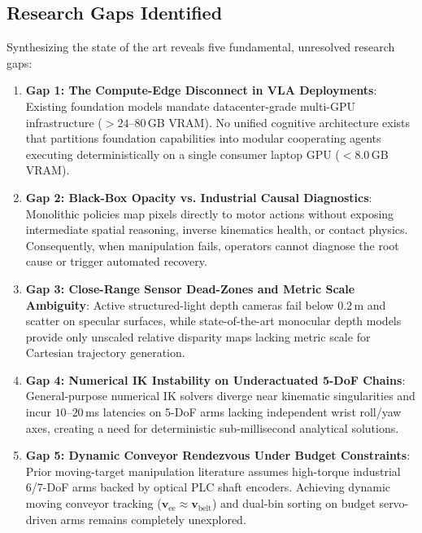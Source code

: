 \documentclass[journal]{IEEEtran}
\begin{document}
\subsection{Research Gaps Identified}
Synthesizing the state of the art reveals five fundamental, unresolved research gaps:
\begin{enumerate}
    \item \textbf{Gap 1: The Compute-Edge Disconnect in VLA Deployments}: Existing foundation models mandate datacenter-grade multi-GPU infrastructure ($>24\text{--}80$\,GB VRAM). No unified cognitive architecture exists that partitions foundation capabilities into modular cooperating agents executing deterministically on a single consumer laptop GPU ($<8.0$\,GB VRAM).
    \item \textbf{Gap 2: Black-Box Opacity vs. Industrial Causal Diagnostics}: Monolithic policies map pixels directly to motor actions without exposing intermediate spatial reasoning, inverse kinematics health, or contact physics. Consequently, when manipulation fails, operators cannot diagnose the root cause or trigger automated recovery.
    \item \textbf{Gap 3: Close-Range Sensor Dead-Zones and Metric Scale Ambiguity}: Active structured-light depth cameras fail below $0.2$\,m and scatter on specular surfaces, while state-of-the-art monocular depth models provide only unscaled relative disparity maps lacking metric scale for Cartesian trajectory generation.
    \item \textbf{Gap 4: Numerical IK Instability on Underactuated 5-DoF Chains}: General-purpose numerical IK solvers diverge near kinematic singularities and incur $10\text{--}20$\,ms latencies on 5-DoF arms lacking independent wrist roll/yaw axes, creating a need for deterministic sub-millisecond analytical solutions.
    \item \textbf{Gap 5: Dynamic Conveyor Rendezvous Under Budget Constraints}: Prior moving-target manipulation literature assumes high-torque industrial 6/7-DoF arms backed by optical PLC shaft encoders. Achieving dynamic moving conveyor tracking ($\mathbf{v}_{\text{ee}} \approx \mathbf{v}_{\text{belt}}$) and dual-bin sorting on budget servo-driven arms remains completely unexplored.
\end{enumerate}
\end{document}
